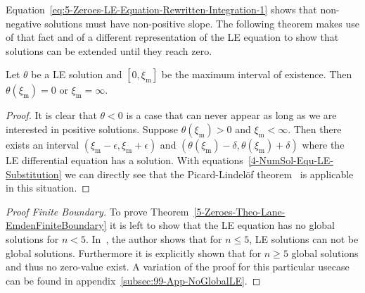 Equation~\eqref{eq:5-Zeroes-LE-Equation-Rewritten-Integration-1} shows that non-negative solutions must have non-positive slope.
The following theorem makes use of that fact and of a different representation of the \ac{LE} equation to show that solutions can be extended until they reach zero.
\begin{lemma}
	Let $\theta$ be a \ac{LE} solution and $[0,\xi_\textrm{m}]$ be the maximum interval of existence.
	Then $\theta(\xi_\textrm{m})=0$ or $\xi_\textrm{m}=\infty$.
\end{lemma}
\begin{proof}
	It is clear that $\theta<0$ is a case that can never appear as long as we are interested in positive solutions.
	Suppose $\theta(\xi_\textrm{m})>0$ and $\xi_\textrm{m}<\infty$.
	Then there exists an interval $(\xi_\textrm{m}-\epsilon,\xi_\textrm{m}+\epsilon)$ and $(\theta(\xi_\textrm{m})-\delta,\theta(\xi_\textrm{m})+\delta)$ where the \ac{LE} differential equation has a solution.
	With equations~\ref{4-NumSol-Equ-LE-Substitution} we can directly see that the Picard-Lindelöf theorem~\cite{lindelofApplicationMethodeApproximations1894} is applicable in this situation.
\end{proof}
\begin{proof}[Proof  Finite Boundary]
	To prove Theorem~\ref{5-Zeroes-Theo-Lane-EmdenFiniteBoundary} it is left to show that the \ac{LE} equation has no global solutions for $n<5$.
	In~\cite[p.~36]{quittnerSuperlinearParabolicProblems2007}, the author shows that for $n\leq5$, \ac{LE} solutions can not be global solutions.
	Furthermore it is explicitly shown that for $n\geq5$ global solutions and thus no zero-value exist.
	A variation of the proof for this particular usecase can be found in appendix~\ref{subsec:99-App-NoGlobalLE}.
\end{proof}
%
%
